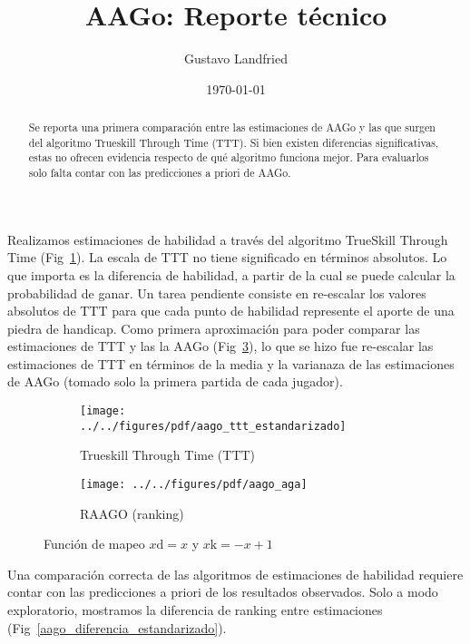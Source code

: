 \documentclass[a4paper,10pt]{article}
\title{AAGo: Reporte t\'ecnico}
\author{Gustavo Landfried}
\date{\today}
\begin{document}
\maketitle

\begin{abstract}
Se reporta una primera comparaci\'on entre las estimaciones de AAGo y las que surgen del algoritmo Trueskill Through Time (TTT). 
Si bien existen diferencias significativas, estas no ofrecen evidencia respecto de qu\'e algoritmo funciona mejor.
Para evaluarlos solo falta contar con las predicciones a priori de AAGo. 
\end{abstract}

Realizamos estimaciones de habilidad a trav\'es del algoritmo TrueSkill Through Time (Fig~\ref{aago_ttt_estandarizado}).
La escala de TTT no tiene significado en t\'erminos absolutos.
Lo que importa es la diferencia de habilidad, a partir de la cual se puede calcular la probabilidad de ganar.
Un tarea pendiente consiste en re-escalar los valores absolutos de TTT para que cada punto de habilidad represente el aporte de una piedra de handicap.
Como primera aproximaci\'on para poder comparar las estimaciones de TTT y las la AAGo (Fig~\ref{aago_aga}), lo que se hizo fue re-escalar las estimaciones de TTT en t\'erminos de la media y la varianaza de las estimaciones de AAGo (tomado solo la primera partida de cada jugador).

 \begin{figure}[H]\centering
\begin{subfigure}[t]{0.48\textwidth}
\texttt{[image: ../../figures/pdf/aago\_ttt\_estandarizado]} 
\caption{Trueskill Through Time (TTT)}
\label{aago_ttt_estandarizado}
\end{subfigure}
\begin{subfigure}[t]{0.48\textwidth}
\texttt{[image: ../../figures/pdf/aago\_aga]} 
\caption{RAAGO (ranking)}
\label{aago_aga}
\end{subfigure}
\caption{Funci\'on de mapeo $x\text{d} = x$ y $x\text{k} = -x + 1$}
\end{figure}

Una comparaci\'on correcta de las algoritmos de estimaciones de habilidad requiere contar con las predicciones a priori de los resultados observados.
Solo a modo exploratorio, mostramos la diferencia de ranking entre estimaciones (Fig~\ref{aago_diferencia_estandarizado}). 

\vspace{0.3cm}
\end{document}
